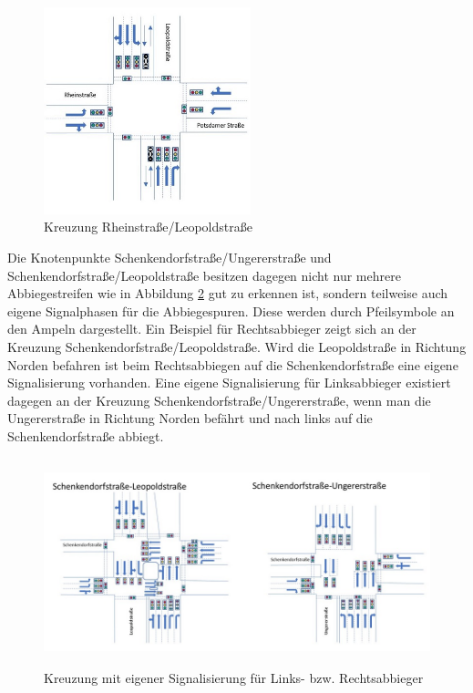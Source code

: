 \begin{savenotes}
	\begin{figure}[H]
		\centering
		\includegraphics[width=6cm,height=6cm]{figures/Rhein_Leo}
		\caption[Kreuzung Rheinstraße/Leopoldstraße]{Kreuzung Rheinstraße/Leopoldstraße \parencite[S. 28]{Kutsch.05.04.2018}}\label{fig:Rhein_Leo}
	\end{figure}
\end{savenotes}

Die Knotenpunkte Schenkendorfstraße/Ungererstraße und Schenkendorfstraße/Leopoldstraße besitzen dagegen nicht nur mehrere Abbiegestreifen wie in Abbildung \ref{fig:eigene_Signalisierung} gut zu erkennen ist, sondern teilweise auch eigene Signalphasen für die Abbiegespuren. Diese werden durch Pfeilsymbole an den Ampeln dargestellt. Ein Beispiel für Rechtsabbieger zeigt sich an der Kreuzung Schenkendorfstraße/Leopoldstraße. Wird die Leopoldstraße in Richtung Norden befahren ist beim Rechtsabbiegen auf die Schenkendorfstraße eine eigene Signalisierung vorhanden. Eine eigene Signalisierung für Linksabbieger existiert dagegen an der Kreuzung Schenkendorfstraße/Ungererstraße, wenn man die Ungererstraße in Richtung Norden befährt und nach links auf die Schenkendorfstraße abbiegt.

\begin{savenotes}
	\begin{figure}[H]
		\centering
		\includegraphics[width=12cm,height=6cm]{figures/Kreuzungen_eigene_Abbiegephase}
		\caption[Kreuzungen mit eigener Signalisierung für Links- bzw. Rechtsabbieger]{Kreuzung mit eigener Signalisierung für Links- bzw. Rechtsabbieger \parencite[S. 30f]{Kutsch.05.04.2018}}\label{fig:eigene_Signalisierung}
	\end{figure}
\end{savenotes}

